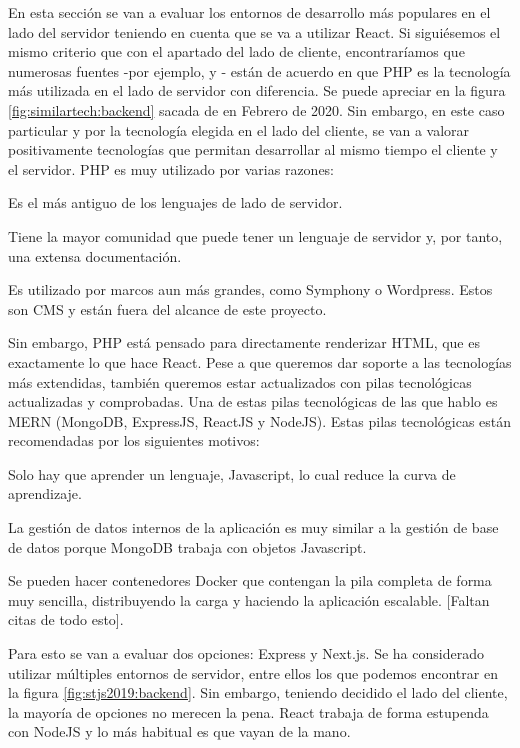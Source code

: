 En esta sección se van a evaluar los entornos de desarrollo más populares en el lado del servidor teniendo en cuenta que se va a utilizar React. Si siguiésemos el mismo criterio que con el apartado del lado de cliente, encontraríamos que numerosas fuentes -por ejemplo, \cite{BKETPF1} y \cite{BKETPF2}- están de acuerdo en que PHP es la tecnología más utilizada en el lado de servidor con diferencia. Se puede apreciar en la figura \cref{fig:similartech:backend} sacada de \cite{BKETPF2} en Febrero de 2020. Sin embargo, en este caso particular y por la tecnología elegida en el lado del cliente, se van a valorar positivamente tecnologías que permitan desarrollar al mismo tiempo el cliente y el servidor. PHP es muy utilizado por varias razones:

\begin{enumeration}
	\item Es el más antiguo de los lenguajes de lado de servidor.
	\item Tiene la mayor comunidad que puede tener un lenguaje de servidor y, por tanto, una extensa documentación.
	\item Es utilizado por marcos aun más grandes, como Symphony o Wordpress. Estos son CMS y están fuera del alcance de este proyecto.
\end{enumeration}

Sin embargo, PHP está pensado para directamente renderizar HTML, que es exactamente lo que hace React. Pese a que queremos dar soporte a las tecnologías más extendidas, también queremos estar actualizados con pilas tecnológicas actualizadas y comprobadas. Una de estas pilas tecnológicas de las que hablo es MERN (MongoDB, ExpressJS, ReactJS y NodeJS). Estas pilas tecnológicas están recomendadas por los siguientes motivos:

\begin{enumeration}
	\item Solo hay que aprender un lenguaje, Javascript, lo cual reduce la curva de aprendizaje.
	\item La gestión de datos internos de la aplicación es muy similar a la gestión de base de datos porque MongoDB trabaja con objetos Javascript.
	\item Se pueden hacer contenedores Docker que contengan la pila completa de forma muy sencilla, distribuyendo la carga y haciendo la aplicación escalable. [Faltan citas de todo esto].
\end{enumeration}

Para esto se van a evaluar dos opciones: Express y Next.js. Se ha considerado utilizar múltiples entornos de servidor, entre ellos los que podemos encontrar en la figura \cref{fig:stjs2019:backend}. Sin embargo, teniendo decidido el lado del cliente, la mayoría de opciones no merecen la pena. React trabaja de forma estupenda con NodeJS y lo más habitual es que vayan de la mano. 

